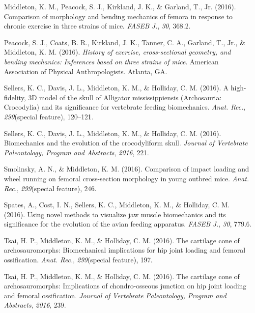 \documentclass[11pt, a4paper]{awesome-cv}
\begin{document}
\leavevmode\hypertarget{ref-middleton_comparison_2016}{}%
Middleton, K. M., Peacock, S. J., Kirkland, J. K., \& Garland, T., Jr.
(2016). Comparison of morphology and bending mechanics of femora in
response to chronic exercise in three strains of mice. \emph{FASEB J.},
\emph{30}, 368.2.

\leavevmode\hypertarget{ref-peacock_history_2016}{}%
Peacock, S. J., Coats, B. R., Kirkland, J. K., Tanner, C. A., Garland,
T., Jr., \& Middleton, K. M. (2016). \emph{History of exercise,
cross-sectional geometry, and bending mechanics: Inferences based on
three strains of mice}. American Association of Physical
Anthropologists. Atlanta, GA.

\leavevmode\hypertarget{ref-sellers_high_2016}{}%
Sellers, K. C., Davis, J. L., Middleton, K. M., \& Holliday, C. M.
(2016). A high-fidelity, 3D model of the skull of Alligator
mississippiensis (Archosauria: Crocodylia) and its significance for
vertebrate feeding biomechanics. \emph{Anat. Rec.}, \emph{299}(special
feature), 120--121.

\leavevmode\hypertarget{ref-sellers_biomechanics_2016}{}%
Sellers, K. C., Davis, J. L., Middleton, K. M., \& Holliday, C. M.
(2016). Biomechanics and the evolution of the crocodyliform skull.
\emph{Journal of Vertebrate Paleontology, Program and Abstracts},
\emph{2016}, 221.

\leavevmode\hypertarget{ref-smolinsky_comparison_2016}{}%
Smolinsky, A. N., \& Middleton, K. M. (2016). Comparison of impact
loading and wheel running on femoral cross-section morphology in young
outbred mice. \emph{Anat. Rec.}, \emph{299}(special feature), 246.

\leavevmode\hypertarget{ref-spates_using_2016}{}%
Spates, A., Cost, I. N., Sellers, K. C., Middleton, K. M., \& Holliday,
C. M. (2016). Using novel methods to visualize jaw muscle biomechanics
and its significance for the evolution of the avian feeding apparatus.
\emph{FASEB J.}, \emph{30}, 779.6.

\leavevmode\hypertarget{ref-tsai_cartilage_2016a}{}%
Tsai, H. P., Middleton, K. M., \& Holliday, C. M. (2016). The cartilage
cone of archosauromorphs: Biomechanical implications for hip joint
loading and femoral ossification. \emph{Anat. Rec.}, \emph{299}(special
feature), 197.

\leavevmode\hypertarget{ref-tsai_cartilage_2016}{}%
Tsai, H. P., Middleton, K. M., \& Holliday, C. M. (2016). The cartilage
cone of archosauromorphs: Implications of chondro-osseous junction on
hip joint loading and femoral ossification. \emph{Journal of Vertebrate
Paleontology, Program and Abstracts}, \emph{2016}, 239.
\end{document}
